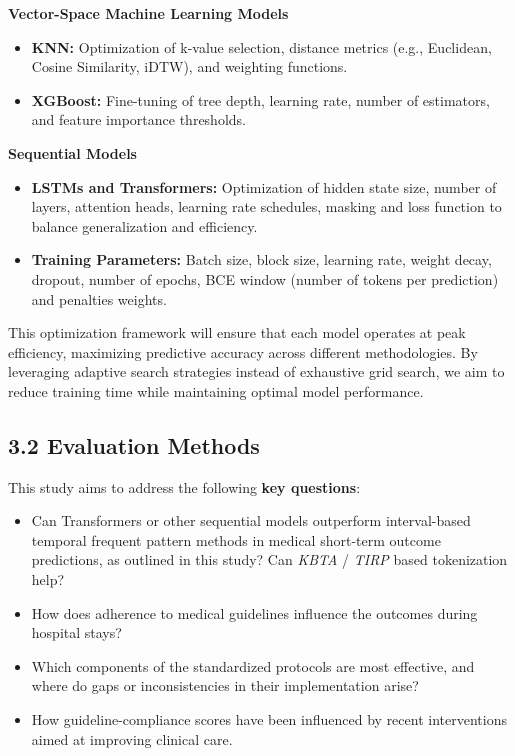 \documentclass[
]{article}
\begin{document}
\textbf{Vector-Space Machine Learning Models}

\begin{itemize}
\item
  \textbf{KNN:} Optimization of k-value selection, distance metrics
  (e.g., Euclidean, Cosine Similarity, iDTW), and weighting functions.
\item
  \textbf{XGBoost:} Fine-tuning of tree depth, learning rate, number of
  estimators, and feature importance thresholds.
\end{itemize}

\textbf{Sequential Models}

\begin{itemize}
\item
  \textbf{LSTMs and Transformers:} Optimization of hidden state size,
  number of layers, attention heads, learning rate schedules, masking
  and loss function to balance generalization and efficiency.
\item
  \textbf{Training Parameters:} Batch size, block size, learning rate,
  weight decay, dropout, number of epochs, BCE window (number of tokens
  per prediction) and penalties weights.
\end{itemize}

This optimization framework will ensure that each model operates at peak
efficiency, maximizing predictive accuracy across different
methodologies. By leveraging adaptive search strategies instead of
exhaustive grid search, we aim to reduce training time while maintaining
optimal model performance.

\subsection{3.2 Evaluation Methods}\label{evaluation-methods}

This study aims to address the following \textbf{key questions}:

\begin{itemize}
\item
  Can Transformers or other sequential models outperform interval-based
  temporal frequent pattern methods in medical short-term outcome
  predictions, as outlined in this study? Can \emph{KBTA} / \emph{TIRP}
  based tokenization help?
\item
  How does adherence to medical guidelines influence the outcomes during
  hospital stays?
\item
  Which components of the standardized protocols are most effective, and
  where do gaps or inconsistencies in their implementation arise?
\item
  How guideline-compliance scores have been influenced by recent
  interventions aimed at improving clinical care.
\end{itemize}
\end{document}
